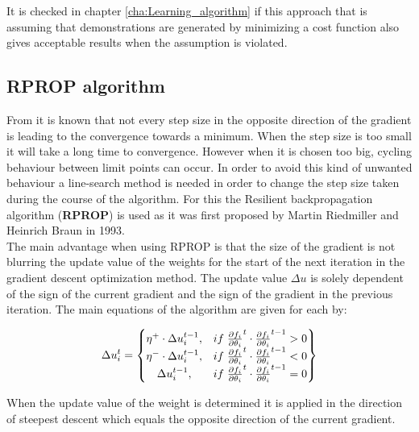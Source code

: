 It is checked in chapter \ref{cha:Learning_algorithm} if this approach that is assuming that demonstrations are generated by minimizing a cost function also gives acceptable results when the assumption is violated.

\subsection{RPROP algorithm}\label{s:RPROP}
From \cite{Panos_opti} it is known that not every step size in the opposite direction of the gradient is leading to the convergence towards a minimum. When the step size is too small it will take a long time to convergence. However when it is chosen too big, cycling behaviour between limit points can occur. In order to avoid this kind of unwanted behaviour a line-search method is needed in order to change the step size taken during the course of the algorithm. For this the Resilient backpropagation algorithm (\textbf{RPROP}) \cite{RPROP} is used as it was first proposed by Martin Riedmiller and Heinrich Braun in 1993.\\

The main advantage when using RPROP is that the size of the gradient is not blurring the update value of the weights for the start of the next iteration in the gradient descent optimization method. The update value $\Delta u$ is solely dependent of the sign of the current gradient and the sign of the gradient in the previous iteration. The main equations of the algorithm are given for each by: 

\begin{equation}\label{eq:7}
	\Delta u^t_i =
	\begin{Bmatrix}
		 \eta^+ \cdot \Delta u^{t-1}_i, & if \hspace{1 mm} \pdv{f_i}{\theta_i}^t \cdot \pdv{f_i}{\theta_i}^{t-1} > 0 \\
		 \eta^- \cdot \Delta u^{t-1}_i, & if \hspace{1 mm} \pdv{f_i}{\theta_i}^t \cdot \pdv{f_i}{\theta_i}^{t-1} < 0 \\
		  \Delta u^{t-1}_i, & if \hspace{1 mm} \pdv{f_i}{\theta_i}^t \cdot \pdv{f_i}{\theta_i}^{t-1} = 0 \\
	\end{Bmatrix}
\end{equation}

When the update value of the weight is determined it is applied in the direction of steepest descent which equals the opposite direction of the current gradient. 

